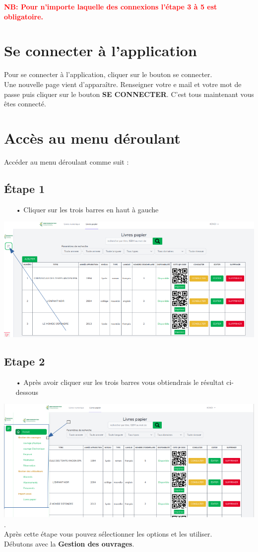 \documentclass[12pt,a4paper]{article}
\begin{document}
\textbf{\textcolor{red}{NB: Pour n'importe laquelle des connexions l'étape 3 à 5 est obligatoire.}}

\newpage
\section{Se connecter à l'application}
Pour se connecter à l'application, cliquer sur le bouton se connecter.\\
Une nouvelle page vient d'apparaître. Renseigner votre e mail et votre mot de passe 
puis cliquer sur le bouton \textbf{SE CONNECTER}. C'est tous maintenant vous êtes 
connecté.

\newpage
\section{Accès au menu déroulant}
Accéder au menu déroulant comme suit : 
\subsection{Étape 1} 
\begin{itemize}
\item[•] Cliquer sur les trois barres en haut à gauche 
\end{itemize}
\includegraphics[scale=0.5]{images/SelectOuvragePhysique.png}

\subsection{Etape 2}
\begin{itemize}
\item[•] Après avoir cliquer sur les trois barres vous obtiendrais le résultat ci-dessous
\end{itemize}
\includegraphics[scale=0.7]{images/TableauDeBord.png}.\\
Après cette étape vous pouvez sélectionner les options et les utiliser.\\
Débutons avec la \textbf{Gestion des ouvrages}.
\end{document}
